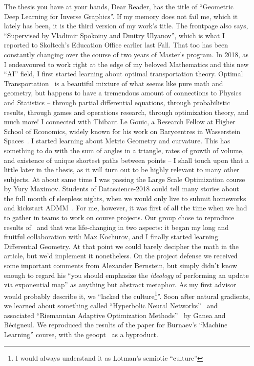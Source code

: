 The thesis you have at your hands, Dear Reader, has the title of ``Geometric
Deep Learning for Inverse Graphics''. If my memory does not fail me, which it
lately has been, it is the third version of my work's title. The frontpage also
says, ``Supervised by Vladimir Spokoiny and Dmitry Ulyanov'', which is what I
reported to Skoltech's Education Office earlier last Fall. That too has been
constantly changing over the course of two years of Master's program.  In 2018,
as I endeavoured to work right at the edge of my beloved Mathematics and this
new ``AI'' field, I first started learning about optimal transportation theory.
Optimal Transportation~\citep{villaniOldNew,ambrosioOTSummerSchool} is a
beautiful mixture of what seems like pure math and geometry, but happens to
have a tremendous amount of connections to Physics and Statistics -- through
partial differential equations, through probabilistic results, through games
and operations research, through optimization theory, and much more! I
connected with Thibaut Le Gouic, a Research Fellow at Higher School of
Economics, widely known for his work on Barycentres in Wasserstein
Spaces~\citep{le2017existence}. I started learning about Metric Geometry and
curvature. This has something to do with the sum of angles in a triangle, rates
of growth of volume, and existence of unique shortest paths between points -- I
shall touch upon that a little later in the thesis, as it will turn out to be
highly relevant to many other subjects. At about same time I was passing the
Large Scale Optimization course by Yury Maximov. Students of Datascience-2018
could tell many stories about the full month of sleepless nights, when we would
only live to submit homeworks and kickstart ADMM~\citep{admmTweet,admmBoyd}.
For me, however, it was first of all the time when we had to gather in teams to work
on course projects. Our group chose to reproduce results
of~\citet{acceleratingNatgrad} and that was life-changing in two aspects: it
began my long and fruitful collaboration with Max Kochurov, and I
finally started learning Differential Geometry. At that point we could barely
decipher the math in the article, but we'd implement it nonetheless. On the project
defense we received some important comments from Alexander Bernstein, but simply
didn't know enough to regard his ``you should emphasize the \emph{ideology}
of performing an update via exponential map'' as anything but abstract
metaphor.  As my first advisor would probably describe it, we ``lacked the
culture\footnote{I would always understand it as Lotman's semiotic
``culture''}''.  Soon after natural gradients, we learned about something called
``Hyperbolic Neural Networks''~\citep{ganeaHNNs} and associated ``Riemannian
Adaptive Optimization Methods''~\citep{riemAdaptive} by Ganea and B\'ecigneul.
We reproduced the results of the paper for Burnaev's ``Machine Learning'' course,
with the geoopt~\cite{geoopt} as a byproduct.

